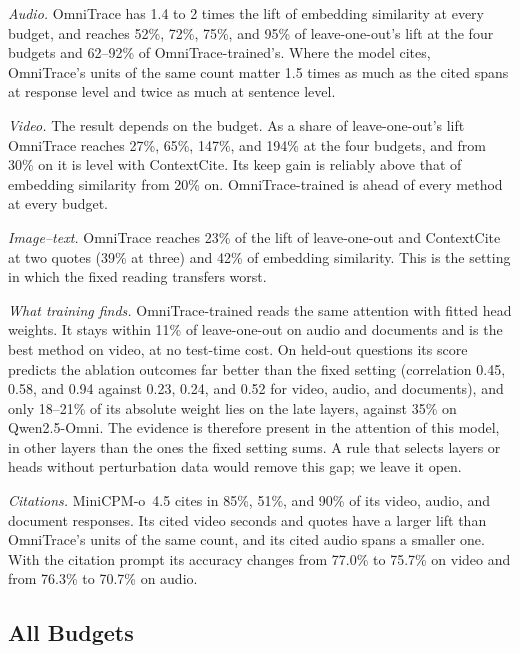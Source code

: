 \emph{Audio.} OmniTrace has 1.4 to 2 times the lift of embedding similarity at every budget, and reaches 52\%, 72\%, 75\%, and 95\% of leave-one-out's lift at the four budgets and 62--92\% of OmniTrace-trained's.
Where the model cites, OmniTrace's units of the same count matter 1.5 times as much as the cited spans at response level and twice as much at sentence level.

\emph{Video.} The result depends on the budget. As a share of leave-one-out's lift OmniTrace reaches 27\%, 65\%, 147\%, and 194\% at the four budgets, and from 30\% on it is level with ContextCite. Its keep gain is reliably above that of embedding similarity from 20\% on. OmniTrace-trained is ahead of every method at every budget.

\emph{Image--text.} OmniTrace reaches 23\% of the lift of leave-one-out and ContextCite at two quotes (39\% at three) and 42\% of embedding similarity. This is the setting in which the fixed reading transfers worst.

\emph{What training finds.} OmniTrace-trained reads the same attention with fitted head weights. It stays within 11\% of leave-one-out on audio and documents and is the best method on video, at no test-time cost. On held-out questions its score predicts the ablation outcomes far better than the fixed setting (correlation 0.45, 0.58, and 0.94 against 0.23, 0.24, and 0.52 for video, audio, and documents), and only 18--21\% of its absolute weight lies on the late layers, against 35\% on Qwen2.5-Omni.
The evidence is therefore present in the attention of this model, in other layers than the ones the fixed setting sums. A rule that selects layers or heads without perturbation data would remove this gap; we leave it open.

\emph{Citations.} MiniCPM-o~4.5 cites in 85\%, 51\%, and 90\% of its video, audio, and document responses. Its cited video seconds and quotes have a larger lift than OmniTrace's units of the same count, and its cited audio spans a smaller one. With the citation prompt its accuracy changes from 77.0\% to 75.7\% on video and from 76.3\% to 70.7\% on audio.

\subsection{All Budgets}
\label{appendix:budgets}

\begin{table}[t]
\centering
\small
\resizebox{\textwidth}{!}{}
\caption{Response-level results of OmniTrace at every budget. Drops are in nats per token. Lift $>0$: share of the questions with a positive lift. Brackets: 95\% bootstrap intervals.}
\label{tab:budget}
\end{table}

